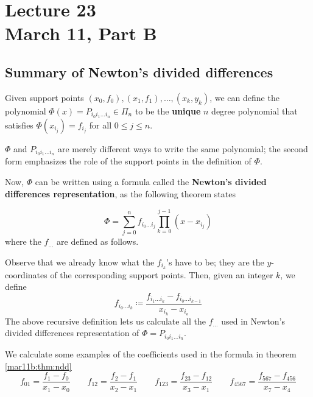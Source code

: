 \chapter*{Lecture 23 \\ March 11, Part B}
\setcounter{chapter}{23}
\setcounter{section}{0}

\section{Summary of Newton's divided differences}

\begin{defn}
  Given support points $(x_0, f_0), (x_1, f_1), \dots ,(x_k, y_k)$, we can define the polynomial $\Phi(x) = P_{i_0i_1\dots i_n} \in \Pi_n$ to be the \textbf{unique} $n$ degree polynomial that satisfies $\Phi(x_{i_j}) = f_{i_j}$ for all $0 \leq j \leq n$.
\end{defn}
\begin{rmk}
  $\Phi$ and $P_{i_0i_1\dots i_n}$ are merely different ways to write the same polynomial; the second form emphasizes the role of the support points in the definition of $\Phi$.
\end{rmk}

 Now, $\Phi$ can be written using a formula called the \textbf{Newton's divided differences representation}, as the following theorem states
 \begin{thm}
   \label{mar11b:thm:ndd}
  \[
    \Phi = \sum_{j = 0}^n f_{i_0\dots i_j}\prod_{k = 0}^{j-1}\left(x - x_{i_j}\right)
  \]
  where the $f_{\dots}$ are defined as follows.

  Observe that we already know what the $f_{i_k}$'s have to be; they are the $y$-coordinates of the corresponding support points.
  Then, given an integer $k$, we define
  \[
    f_{i_0\dots i_{k}} \coloneqq \frac{f_{i_1\dots i_{k}} - f_{i_0\dots i_{k-1}}}{x_{i_k} - x_{i_o}}
  \]
  The above recursive definition lets us calculate all the $f_{\dots}$ used in Newton's divided differences representation of $\Phi = P_{i_0i_1\dots i_n}$.
\end{thm}

\begin{example}
  We calculate some examples of the coefficients used in the formula in theorem \ref{mar11b:thm:ndd}
  \[
    f_{01} = \frac{f_1 - f_0}{x_1 - x_0}
    \qquad
    f_{12} = \frac{f_2 - f_1}{x_2 - x_1}
    \qquad
    f_{123} = \frac{f_{23} - f_{12}}{x_3 - x_1}
    \qquad
    f_{4567} = \frac{f_{567} - f_{456}}{x_7 - x_4}
  \]
\end{example}

